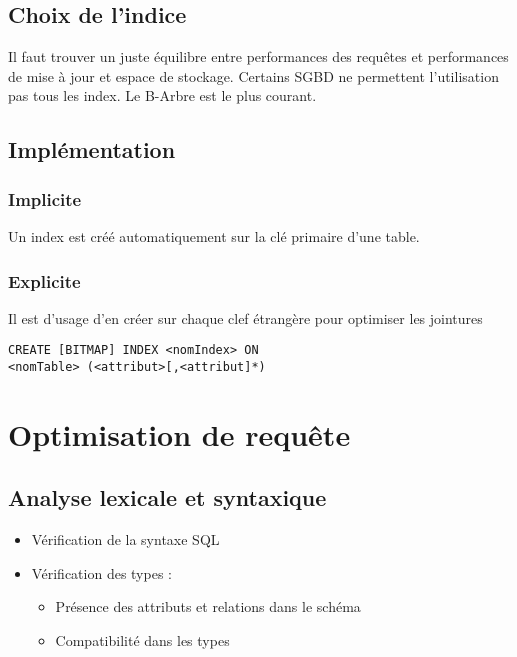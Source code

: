 \documentclass[10pt,a4paper,twoside]{article}
\begin{document}
\subsection{Choix de l'indice}
Il faut trouver un juste équilibre entre performances des requêtes et performances de mise à jour et espace de stockage. Certains SGBD ne permettent l'utilisation pas tous les index. Le B-Arbre est le plus courant.


\subsection{Implémentation}
\subsubsection{Implicite}
Un index est créé automatiquement sur la clé primaire d'une table.

\subsubsection{Explicite}
Il est d'usage d'en créer sur chaque clef étrangère pour optimiser les jointures

\begin{verbatim}
CREATE [BITMAP] INDEX <nomIndex> ON 
<nomTable> (<attribut>[,<attribut]*)
\end{verbatim}

\section{Optimisation de requête}

\subsection{Analyse lexicale et syntaxique}
\begin{itemize}
\item Vérification de la syntaxe SQL
\item Vérification des types :
\begin{itemize}
\item Présence des attributs et relations dans le schéma
\item Compatibilité dans les types
\end{itemize}
\end{itemize}
\end{document}
